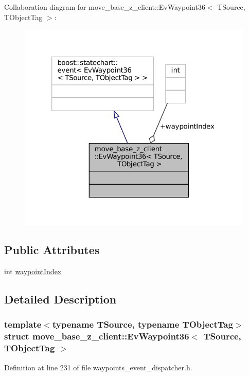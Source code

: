 Collaboration diagram for move\+\_\+base\+\_\+z\+\_\+client\+:\+:Ev\+Waypoint36$<$ T\+Source, T\+Object\+Tag $>$\+:
\nopagebreak
\begin{figure}[H]
\begin{center}
\leavevmode
\includegraphics[width=320pt]{structmove__base__z__client_1_1EvWaypoint36__coll__graph}
\end{center}
\end{figure}
\subsection*{Public Attributes}
\begin{DoxyCompactItemize}
\item 
int \hyperlink{structmove__base__z__client_1_1EvWaypoint36_a886363b1e3dca28236356909d9a4678c}{waypoint\+Index}
\end{DoxyCompactItemize}


\subsection{Detailed Description}
\subsubsection*{template$<$typename T\+Source, typename T\+Object\+Tag$>$\newline
struct move\+\_\+base\+\_\+z\+\_\+client\+::\+Ev\+Waypoint36$<$ T\+Source, T\+Object\+Tag $>$}



Definition at line 231 of file waypoints\+\_\+event\+\_\+dispatcher.\+h.



